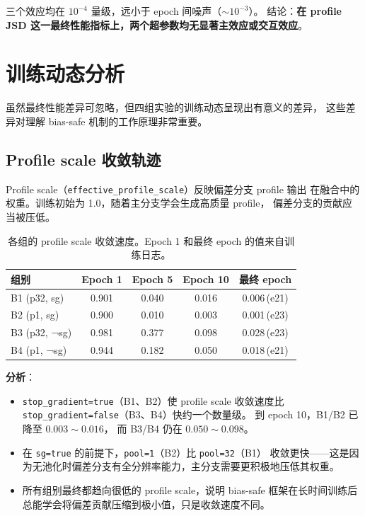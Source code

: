 \documentclass[11pt,a4paper]{ctexart}
\begin{document}
三个效应均在 $10^{-4}$ 量级，远小于 epoch 间噪声（$\sim 10^{-3}$）。
结论：\textbf{在 profile JSD 这一最终性能指标上，两个超参数均无显著主效应或交互效应}。

\section{训练动态分析}

虽然最终性能差异可忽略，但四组实验的训练动态呈现出有意义的差异，
这些差异对理解 bias-safe 机制的工作原理非常重要。

\subsection{Profile scale 收敛轨迹}

Profile scale（\texttt{effective\_profile\_scale}）反映偏差分支 profile 输出
在融合中的权重。训练初始为 1.0，随着主分支学会生成高质量 profile，
偏差分支的贡献应当被压低。

\begin{table}[H]
\centering
\small
\caption{各组的 profile scale 收敛速度。Epoch 1 和最终 epoch 的值来自训练日志。}
\label{tab:profile_scale}
\begin{tabular}{l c c c c}
\toprule
组别 & Epoch 1 & Epoch 5 & Epoch 10 & 最终 epoch \\
\midrule
B1 (p32, sg)   & 0.901 & 0.040 & 0.016 & 0.006\,(e21) \\
B2 (p1, sg)    & 0.900 & 0.010 & 0.003 & 0.001\,(e23) \\
B3 (p32, ¬sg)  & 0.981 & 0.377 & 0.098 & 0.028\,(e23) \\
B4 (p1, ¬sg)   & 0.944 & 0.182 & 0.050 & 0.018\,(e21) \\
\bottomrule
\end{tabular}
\end{table}

\textbf{分析}：
\begin{itemize}[leftmargin=2em]
  \item \texttt{stop\_gradient=true}（B1、B2）使 profile scale 收敛速度比
    \texttt{stop\_gradient=false}（B3、B4）快约一个数量级。
    到 epoch 10，B1/B2 已降至 $0.003 \sim 0.016$，
    而 B3/B4 仍在 $0.050 \sim 0.098$。
  \item 在 \texttt{sg=true} 的前提下，\texttt{pool=1}（B2）比 \texttt{pool=32}（B1）
    收敛更快——这是因为无池化时偏差分支有全分辨率能力，主分支需要更积极地压低其权重。
  \item 所有组别最终都趋向很低的 profile scale，说明 bias-safe 框架在长时间训练后
    总能学会将偏差贡献压缩到极小值，只是收敛速度不同。
\end{itemize}
\end{document}
